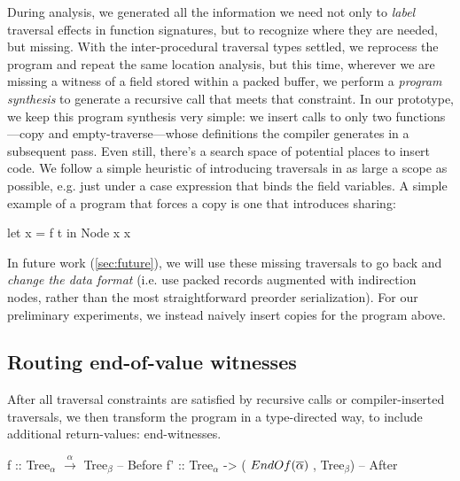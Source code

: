 \documentclass[a4paper,english]{lipics-v2016}
\newcommand{\travarr}[1]{\xrightarrow{#1}}
\newcommand{\fresh}[1]{\ensuremath{#1}}
\newcommand{\freshA}{\fresh{\alpha}}
\newcommand{\freshB}{\fresh{\beta}}
\newcommand{\locend}[1]{\ensuremath{\overline{#1}}}
\begin{document}
{During analysis, we generated all the information we need not only to {\em
    label} traversal effects in function signatures, but to recognize where they are needed, but
  missing.}
\Red
{With the inter-procedural traversal types settled, we reprocess
  the program and repeat the same location analysis, but this time, wherever we
  are missing a witness of a field stored within a packed buffer, we perform a
  {\em program synthesis} to generate a recursive call that meets that constraint.
In our prototype, we keep this program synthesis very simple: we insert calls to
only two functions---copy and empty-traverse---whose definitions the compiler
generates in a subsequent pass.  {Even still, there's a search space of
  potential places to insert code.  We follow a simple heuristic of introducing
  traversals in as large a scope as possible, e.g. just under a case expression
  that binds the field variables.}}
A simple example of a program that forces a copy is one that introduces sharing:
%
\begin{code}
let x = f t in  Node x x 
\end{code}

In future work (\cref{sec:future}), we will use these missing traversals to go
back and {\em change the data format} (i.e. use packed records {augmented} with
indirection nodes, rather than the most straightforward preorder serialization).
%
For our preliminary experiments, we instead naively insert copies for the
program above.


\subsection{Routing end-of-value witnesses}

After all traversal constraints are satisfied by recursive calls or
compiler-inserted traversals, we then transform the program in a type-directed
way, to include additional return-values: end-witnesses.

\begin{code}
  f  :: Tree$_\freshA$ $\travarr{\freshA}$ Tree$_\freshB$                  -- Before
  f' :: Tree$_\freshA$ -> ($\ENDOF{\locend{\freshA}}$, Tree$_\freshB$) -- After
\end{code}
\end{document}
